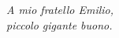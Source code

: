 \thispagestyle{empty}
\begin{flushright}
\vspace*{3.0cm}
{\large \textit{A mio fratello Emilio,}} \\ 
{\large \textit{piccolo gigante buono.}} \\ 
\end{flushright}

